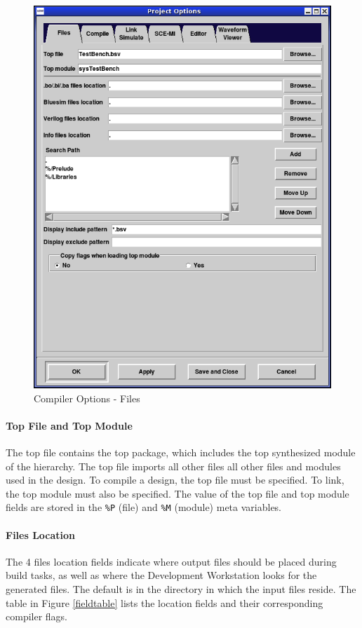 \documentclass{article}
\newcommand{\te}[1]{\texttt{#1}}
\begin{document}
\begin{figure}[ht]
\begin{center}
\includegraphics[width = 3 in]{figures/options-files}
\caption{Compiler Options - Files}
\label{fig-files}
\end{center}
\end{figure}


\paragraph{Top File and Top Module}

 The top file contains the top package, which includes the  top
synthesized module of the hierarchy.  The top file imports all other files
 all other files and modules used in the design.
To compile a design, the top file must be specified.  To link,
the  top module must also be specified.   The value of the top file
and top module
fields are stored in the \te{\%P} (file)
and \te{\%M}  (module) meta variables.



\paragraph{Files Location}

The 4 files location fields  indicate where output files should be placed
during build tasks, as well as where the Development
Workstation looks for the generated files.
 The  default is in
the directory in which the input files reside.   The table in Figure
\ref{fieldtable} lists the   location
fields and their  corresponding compiler flags.
\end{document}
